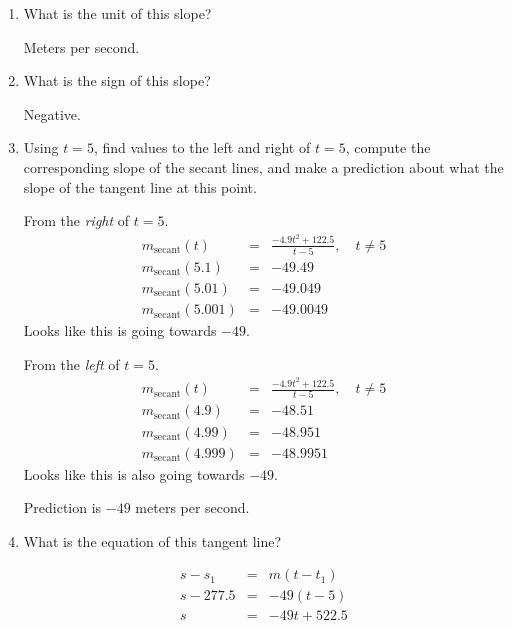 \documentclass[12pt,addpoints, answers, fleqn]{exam}
\begin{document}
\begin{enumerate}
\item What is the unit of this slope?

\begin{solution}
Meters per second.
\end{solution}
\item What is the sign of this slope?

\begin{solution}
Negative.
\end{solution}

\item Using $t=5$, find values to the left and right of $t=5$, compute the corresponding slope of the secant lines, and make a prediction about what the slope of the tangent line at this point.\



\begin{solution}
From the \emph{right} of $t=5$.
\begin{eqnarray*}
m_{\mbox{secant}} \left( t \right) &=& \frac{-4.9 t^2 +122.5 }{t-5}, \quad t \neq 5\\
m_{\mbox{secant}} \left( 5.1 \right) &=& -49.49\\
m_{\mbox{secant}} \left( 5.01 \right) &=& -49.049\\
m_{\mbox{secant}} \left( 5.001 \right) &=& -49.0049
\end{eqnarray*}
Looks like this is going towards $-49$.

From the \emph{left} of $t=5$.
\begin{eqnarray*}
m_{\mbox{secant}} \left( t \right) &=& \frac{-4.9 t^2 +122.5 }{t-5}, \quad t \neq 5\\
m_{\mbox{secant}} \left( 4.9 \right) &=& -48.51\\
m_{\mbox{secant}} \left( 4.99 \right) &=& -48.951\\
m_{\mbox{secant}} \left( 4.999 \right) &=& -48.9951
\end{eqnarray*}
Looks like this is also going towards $-49$.

Prediction is $-49$ meters per second.
\end{solution}

\item What is the equation of this tangent line?
\begin{solution}
\begin{eqnarray*}
s-s_1 &=& m \left( t - t_1\right)\\
s - 277.5 &=& -49 \left( t - 5 \right)\\
s &=& -49 t + 522.5
\end{eqnarray*}
\end{solution}


\end{enumerate}
\end{document}
